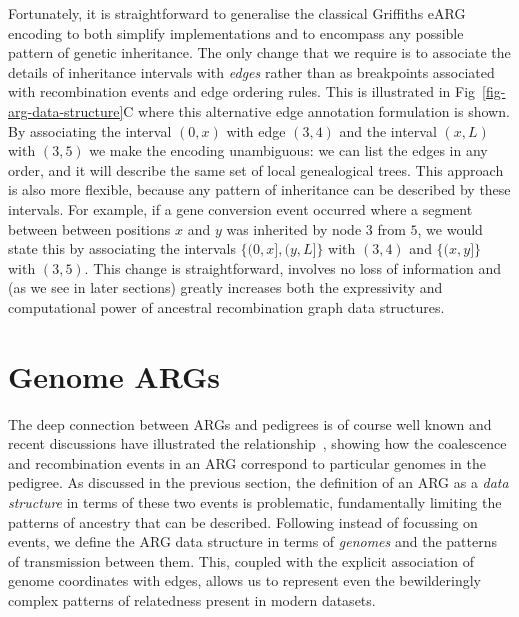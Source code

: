 \documentclass{article}
\begin{document}
Fortunately, it is straightforward to generalise the classical Griffiths
eARG encoding to both simplify implementations and to encompass any
possible pattern of genetic inheritance.
The only change that we require is to associate
the details of inheritance intervals with \emph{edges} rather than
as breakpoints associated with recombination events and
edge ordering rules. This is illustrated in Fig~\ref{fig-arg-data-structure}C
where this alternative edge annotation formulation is
shown. By associating the interval $(0, x)$ with edge $(3,4)$
and the interval $(x, L)$ with $(3, 5)$ we make the encoding
unambiguous: we can list the edges in any order, and it
will describe the same set of local genealogical trees.
This approach is also more flexible, because any pattern
of inheritance can be described by these intervals. For
example, if a gene conversion event occurred where a segment
between between positions $x$ and $y$ was inherited by
node $3$ from $5$, we would state this by associating
the intervals $\{(0, x], (y, L]\}$ with $(3,4)$ and
$\{(x, y]\}$ with $(3,5)$.
This change is straightforward, involves no loss of information
and (as we see in later sections)
greatly increases both the expressivity and computational
power of ancestral recombination graph data structures.

\section*{Genome ARGs}
The deep connection between ARGs and pedigrees is of course
well known
\citep[e.g.][]{wakeley2012genetics,gusfield2014recombinatorics,
speed2015naturereviewsgenetics}
and recent discussions have illustrated the
relationship~\citep{mathieson2020ancestry,brandt2021evaluation}, %
showing how the coalescence and recombination events in an ARG
correspond to particular genomes in the pedigree.
As discussed in the previous section, the definition of an ARG
as a \emph{data structure} in terms of these two events is problematic,
fundamentally limiting the patterns of ancestry that can be described.
Following \cite{mathieson2020ancestry} instead of focussing on events,
we define the ARG data structure in terms of \emph{genomes} and the
patterns of transmission between them.
This, coupled with
the explicit association of genome coordinates with edges, allows
us to represent even the bewilderingly complex patterns of relatedness
present in modern datasets.
\end{document}
